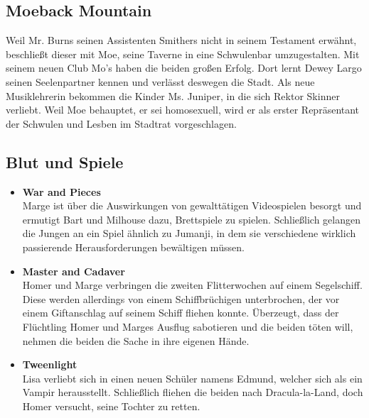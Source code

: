 \subsection{Moeback Mountain}\label{NABF04}
Weil Mr. Burns seinen Assistenten Smithers nicht in seinem Testament erwähnt, beschließt dieser mit Moe, seine Taverne in eine Schwulenbar umzugestalten. Mit seinem neuen Club Mo's haben die beiden großen Erfolg. Dort lernt Dewey Largo seinen Seelenpartner kennen und verlässt deswegen die Stadt. Als neue Musiklehrerin bekommen die Kinder Ms. Juniper, in die sich Rektor Skinner verliebt. Weil Moe behauptet, er sei homosexuell, wird er als erster Repräsentant der Schwulen und Lesben im Stadtrat vorgeschlagen.


\subsection{Blut und Spiele}

\begin{itemize}
	\item \textbf{War and Pieces}\\ Marge ist über die Auswirkungen von gewalttätigen Videospielen besorgt und ermutigt Bart und Milhouse dazu, Brettspiele zu spielen. Schließlich gelangen die Jungen an ein Spiel ähnlich zu Jumanji, in dem sie verschiedene wirklich passierende Herausforderungen bewältigen müssen.
	\item \textbf{Master and Cadaver}\\ Homer und Marge verbringen die zweiten Flitterwochen auf einem Segelschiff. Diese werden allerdings von einem Schiffbrüchigen unterbrochen, der vor einem Giftanschlag auf seinem Schiff fliehen konnte. Überzeugt, dass der Flüchtling Homer und Marges Ausflug sabotieren und die beiden töten will, nehmen die beiden die Sache in ihre eigenen Hände.
	\item \textbf{Tweenlight}\\ Lisa verliebt sich in einen neuen Schüler namens Edmund, welcher sich als ein Vampir herausstellt. Schließlich fliehen die beiden nach Dracula-la-Land, doch Homer versucht, seine Tochter zu retten. 
\end{itemize}


